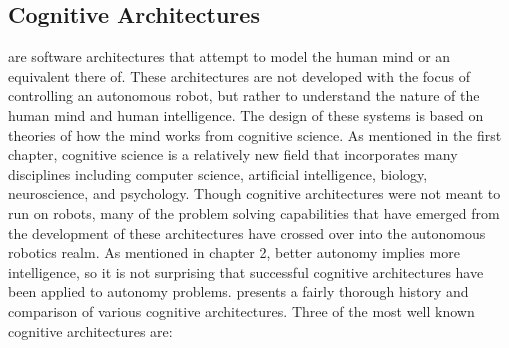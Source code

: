 \subsection{Cognitive Architectures}
 are software architectures that attempt to model the human mind or an equivalent there of. These architectures are not developed with the focus of controlling an autonomous robot, but rather to understand the nature of the human mind and human intelligence. The design of these systems is based on theories of how the mind works from cognitive science. As mentioned in the first chapter, cognitive science is a relatively new field that incorporates many disciplines including computer science, artificial intelligence, biology, neuroscience, and psychology. Though cognitive architectures were not meant to run on robots, many of the problem solving capabilities that have emerged from the development of these architectures have crossed over into the autonomous robotics realm. As mentioned in chapter 2, better autonomy implies more intelligence, so it is not surprising that successful cognitive architectures have been applied to autonomy problems. \citet{vernon:surveyofcognitivesys} presents a fairly thorough history and comparison of various cognitive architectures. Three of the most well known cognitive architectures are:

